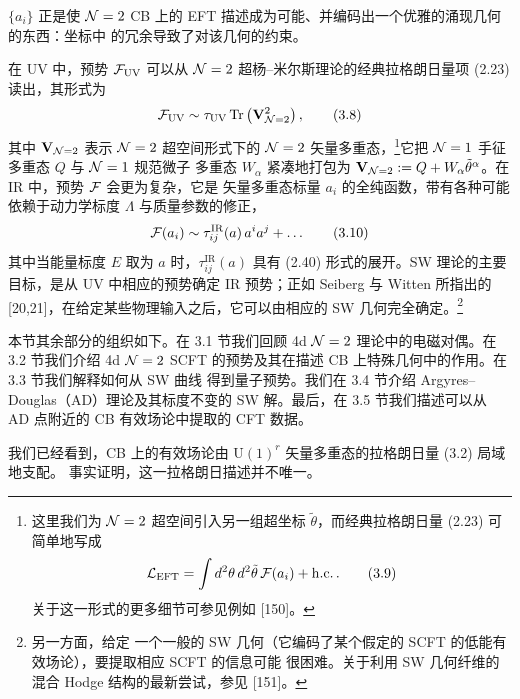 
$\{a_i\}$ 正是使 $\mathcal{N}=2$ CB 上的 EFT 描述成为可能、并编码出一个优雅的涌现几何的东西：坐标中
的冗余导致了对该几何的约束。

在 UV 中，预势 $\mathcal{F}_{\mathrm{UV}}$ 可以从 $\mathcal{N}=2$ 超杨--米尔斯理论的经典拉格朗日量项 (2.23)
读出，其形式为
\begin{equation}
  \mathcal{F}_{\mathrm{UV}} \sim \tau_{\mathrm{UV}}\operatorname{Tr}\left(\mathbf V_{\mathcal{N}=2}^2\right),
  \tag{3.8}
\end{equation}
其中 $\mathbf V_{\mathcal{N}=2}$ 表示 $\mathcal{N}=2$ 超空间形式下的 $\mathcal{N}=2$ 矢量多重态，\footnote{这里我们为
$\mathcal{N}=2$ 超空间引入另一组超坐标 $\tilde\theta$，而经典拉格朗日量 (2.23) 可简单地写成
\begin{equation}
  \mathcal{L}_{\mathrm{EFT}} = \int d^2\theta\,d^2\tilde\theta\,\mathcal{F}(a_i) + \mathrm{h.c.}\,.
  \tag{3.9}
\end{equation}
关于这一形式的更多细节可参见例如 [150]。}它把 $\mathcal{N}=1$ 手征多重态 $Q$ 与 $\mathcal{N}=1$ 规范微子
多重态 $W_\alpha$ 紧凑地打包为
$\mathbf V_{\mathcal{N}=2} := Q + W_\alpha\tilde\theta^\alpha$。在 IR 中，预势 $\mathcal{F}$ 会更为复杂，它是
矢量多重态标量 $a_i$ 的全纯函数，带有各种可能依赖于动力学标度 $\Lambda$ 与质量参数的修正，
\begin{equation}
  \mathcal{F}(a_i) \sim \tau^{\mathrm{IR}}_{ij}(a)\,a^i a^j + \ldots
  \tag{3.10}
\end{equation}
其中当能量标度 $E$ 取为 $a$ 时，$\tau^{\mathrm{IR}}_{ij}(a)$ 具有 (2.40) 形式的展开。SW
理论的主要目标，是从 UV 中相应的预势确定 IR 预势；正如 Seiberg 与 Witten 所指出的
[20,21]，在给定某些物理输入之后，它可以由相应的 SW 几何完全确定。\footnote{另一方面，给定
一个一般的 SW 几何（它编码了某个假定的 SCFT 的低能有效场论），要提取相应 SCFT 的信息可能
很困难。关于利用 SW 几何纤维的混合 Hodge 结构的最新尝试，参见 [151]。}

本节其余部分的组织如下。在 3.1 节我们回顾 4d $\mathcal{N}=2$ 理论中的电磁对偶。在 3.2 节我们介绍
4d $\mathcal{N}=2$ SCFT 的预势及其在描述 CB 上特殊几何中的作用。在 3.3 节我们解释如何从 SW 曲线
得到量子预势。我们在 3.4 节介绍 Argyres--Douglas（AD）理论及其标度不变的 SW 解。最后，在
3.5 节我们描述可以从 AD 点附近的 CB 有效场论中提取的 CFT 数据。



我们已经看到，CB 上的有效场论由 $\mathrm{U}(1)^r$ 矢量多重态的拉格朗日量 (3.2) 局域地支配。
事实证明，这一拉格朗日描述并不唯一。
